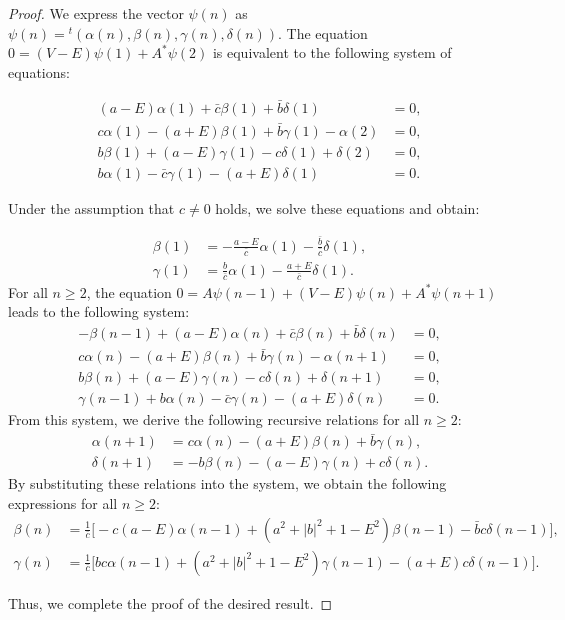 \documentclass{amsart}
\theoremstyle{definition}
\theoremstyle{remark}
\begin{document}
\begin{proof}
We express the vector \(\psi(n)\) as \(\psi(n) = {}^t (\alpha(n), \beta(n), \gamma(n), \delta(n))\). The equation \(0 = (V - E)\psi(1) + A^* \psi(2)\) is equivalent to the following system of equations:

\begin{align*}
(a - E)\alpha(1) + \bar{c}\beta(1) + \bar{b}\delta(1) &= 0, \\
c\alpha(1) - (a + E)\beta(1) + \bar{b}\gamma(1) - \alpha(2) &= 0, \\
b\beta(1) + (a - E)\gamma(1) - c\delta(1) + \delta(2) &= 0, \\
b\alpha(1) - \bar{c}\gamma(1) - (a + E)\delta(1) &= 0.
\end{align*}

Under the assumption that \(c \neq 0\) holds, we solve these equations and obtain:

\begin{align*}
\beta(1) &= -\frac{a - E}{\bar{c}}\alpha(1) - \frac{\bar{b}}{\bar{c}}\delta(1), \\
\gamma(1) &= \frac{b}{\bar{c}}\alpha(1) - \frac{a + E}{\bar{c}}\delta(1).
\end{align*}
For all \(n \geq 2\), the equation \(0 = A\psi(n - 1) + (V - E)\psi(n) + A^*\psi(n + 1)\) leads to the following system:
\begin{align*}
-\beta(n - 1) + (a - E)\alpha(n) + \bar{c}\beta(n) + \bar{b}\delta(n) &= 0, \\
c\alpha(n) - (a + E)\beta(n) + \bar{b}\gamma(n) - \alpha(n + 1) &= 0, \\
b\beta(n) + (a - E)\gamma(n) - c\delta(n) + \delta(n + 1) &= 0, \\
\gamma(n - 1) + b\alpha(n) - \bar{c}\gamma(n) - (a + E)\delta(n) &= 0.
\end{align*}
From this system, we derive the following recursive relations for all \(n \geq 2\):
\begin{align*}
\alpha(n + 1) &= c\alpha(n) - (a + E)\beta(n) + \bar{b}\gamma(n), \\
\delta(n + 1) &= -b\beta(n) - (a - E)\gamma(n) + c\delta(n).
\end{align*}
By substituting these relations into the system, we obtain the following expressions for all \(n \geq 2\):
\begin{align*}
\beta(n) &= \frac{1}{\bar{c}} \big[ -c(a - E)\alpha(n - 1) + (a^2 + |b|^2 + 1 - E^2)\beta(n - 1) - \bar{b}c\delta(n - 1) \big], \\
\gamma(n) &= \frac{1}{\bar{c}} \big[ bc\alpha(n - 1) + (a^2 + |b|^2 + 1 - E^2)\gamma(n - 1) - (a + E)c\delta(n - 1) \big].
\end{align*}

Thus, we complete the proof of the desired result.
\end{proof}
\end{document}

